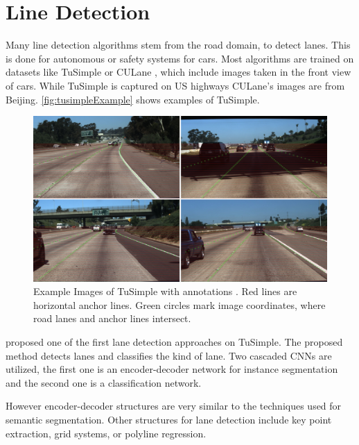 \section{Line Detection}
\label{sec:lineDetection}

Many line detection algorithms stem from the road domain, to detect lanes.
This is done for autonomous or safety systems for cars.
Most algorithms are trained on datasets like TuSimple \cite{tuSimpleDataset} or CULane \cite{cuLaneDataset}, which include images taken in the front view of cars.
While TuSimple is captured on US highways CULane's images are from Beijing.
\autoref{fig:tusimpleExample} shows examples of TuSimple.

\vspace{1cm}

\begin{figure}[H]
    \centering
    \includegraphics[width=\linewidth]{PICs/lineDetection/tusimple_example.jpg}
    \caption{Example Images of TuSimple with annotations \cite{tuSimpleDatasetExampleImage}. Red lines are horizontal anchor lines. Green circles mark image coordinates, where road lanes and anchor lines intersect.}
    \label{fig:tusimpleExample}
\end{figure}

\vspace{1cm}

\cite{LaneDetectionCascadedCNNs2019} proposed one of the first lane detection approaches on TuSimple.
The proposed method detects lanes and classifies the kind of lane.
Two cascaded CNNs are utilized, the first one is an encoder-decoder network for instance segmentation and the second one is a classification network.

However encoder-decoder structures are very similar to the techniques used for semantic segmentation.
Other structures for lane detection include key point extraction, grid systems, or polyline regression.

